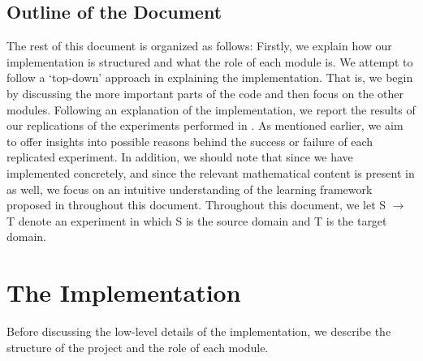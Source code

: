 \documentclass[14pt]{extarticle}
\begin{document}
		\subsection{Outline of the Document}
		The rest of this document is organized as follows: Firstly, we explain how our implementation is structured and what the role of each module is. We attempt to follow a `top-down' approach in explaining the implementation. That is, we begin by discussing the more important parts of the code and then focus on the other modules. Following an explanation of the implementation, we report the results of our replications of the experiments performed in \cite{adda}. As mentioned earlier, we aim to offer insights into possible reasons behind the success or failure of each replicated experiment. In addition, we should note that since we have implemented \cite{adda} concretely, and since the relevant mathematical content is present in \cite{adda} as well, we focus on an intuitive understanding of the learning framework proposed in \cite{adda} throughout this document. Throughout this document, we let S $\rightarrow$ T denote an experiment in which S is the source domain and T is the target domain.
		\section{The Implementation}
		Before discussing the low-level details of the implementation, we describe the structure of the project and the role of each module.
\end{document}

